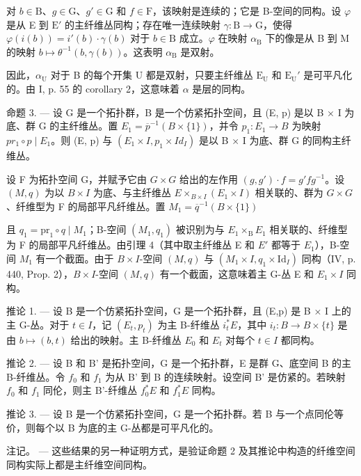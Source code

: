 对 \(b \in \mathrm{B}\)、\(g \in \mathrm{G}\)、\(g' \in \mathrm{G}\) 和 \(f \in \mathrm{F}\)，该映射是连续的；它是 B-空间的同构。设 \(\varphi\) 是从 E 到 \(\mathrm{E}'\) 的主纤维丛同构；存在唯一连续映射 \(\gamma: \mathrm{B} \to \mathrm{G}\)，使得 \(\varphi(i(b)) = i'(b) \cdot \gamma(b)\) 对于 \(b \in \mathrm{B}\) 成立。\(\varphi\) 在映射 \(\alpha_{\mathrm{B}}\) 下的像是从 B 到 M 的映射 \(b \mapsto \theta^{-1}(b, \gamma(b))\)。这表明 \(\alpha_{\mathrm{B}}\) 是双射。

因此，\(\alpha_{\mathrm{U}}\) 对于 B 的每个开集 U 都是双射，只要主纤维丛 \(\mathrm{E_U}\) 和 \(\mathrm{E_U}'\) 是可平凡化的。由 I, p. 55 的 corollary 2，这意味着 \(\alpha\) 是层的同构。

命题 3. --- 设 G 是一个拓扑群，B 是一个仿紧拓扑空间，且 (E, p) 是以 B × I 为底、群 G 的主纤维丛。置 \(E_{1} = \overline{p}^{-1}(B \times \{1\})\)，并令 \(p_{1}: E_{1} \to B\) 为映射 \(pr_{1} \circ p \mid E_{1}\)。则 (E, p) 与 \((E_{1} \times I, p_{1} \times Id_{I})\) 是以 B × I 为底、群 G 的同构主纤维丛。

设 F 为拓扑空间 G，并赋予它由 \(G \times G\) 给出的左作用 \((g, g') \cdot f = g' fg^{-1}\)。设 \((M, q)\) 为以 \(B \times I\) 为底、与主纤维丛 \(E \times_{B \times I}(E_1 \times I)\) 相关联的、群为 \(G \times G\)、纤维型为 F 的局部平凡纤维丛。置 \(M_1 = \overline{q}^{-1}(B \times \{1\})\)

且 \(q_1 = \mathrm{pr}_1 \circ q \mid M_1\)；B-空间 \((M_1, q_1)\) 被识别为与 \(E_1 \times_\mathrm{B} E_1\) 相关联的、纤维型为 F 的局部平凡纤维丛。由引理 4（其中取主纤维丛 E 和 \(E'\) 都等于 \(E_1\)），B-空间 \(M_1\) 有一个截面。由于 \(B \times I\)-空间 \((M, q)\) 与 \((M_1 \times I, q_1 \times \mathrm{Id}_{I})\) 同构（IV, p. 440, Prop. 2），\(B \times I\)-空间 \((M, q)\) 有一个截面，这意味着主 G-丛 E 和 \(E_1 \times I\) 同构。

推论 1. --- 设 B 是一个仿紧拓扑空间，G 是一个拓扑群，且 (E,p) 是 B × I 上的主 G-丛。对于 \(t \in I\)，记 \((E_{t}, p_{t})\) 为主 B-纤维丛 \(i_{t}^{*}E\)，其中 \(i_{t}: B \to B \times \{t\}\) 是由 \(b \mapsto (b, t)\) 给出的映射。主 B-纤维丛 \(E_{0}\) 和 \(E_{t}\) 对每个 \(t \in I\) 都同构。

推论 2. --- 设 B 和 B' 是拓扑空间，G 是一个拓扑群，E 是群 G、底空间 B 的主 B-纤维丛。令 \(f_0\) 和 \(f_1\) 为从 B' 到 B 的连续映射。设空间 B' 是仿紧的。若映射 \(f_0\) 和 \(f_1\) 同伦，则主 B'-纤维丛 \(f_0^*E\) 和 \(f_1^*E\) 同构。

推论 3. --- 设 B 是一个仿紧拓扑空间，G 是一个拓扑群。若 B 与一个点同伦等价，则每个以 B 为底的主 G-丛都是可平凡化的。

注记。 --- 这些结果的另一种证明方式，是验证命题 2 及其推论中构造的纤维空间同构实际上都是主纤维空间同构。


